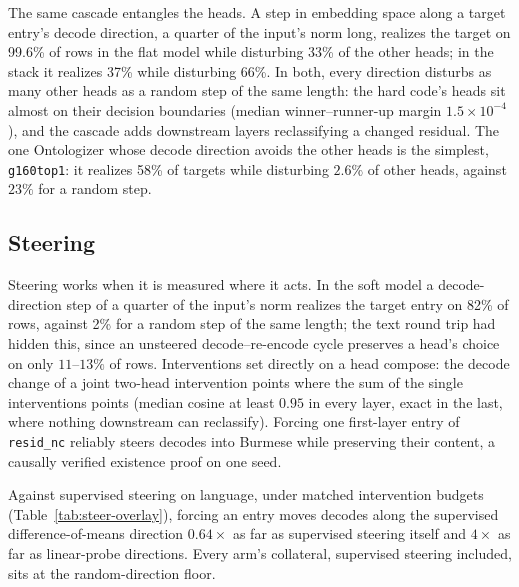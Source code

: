 The same cascade entangles the heads. A step in embedding space along a
target entry's decode direction, a quarter of the input's norm long,
realizes the target on 99.6\% of rows in the flat model while disturbing
33\% of the other heads; in the stack it realizes 37\% while disturbing
66\%. In both, every direction disturbs as many other heads as a random
step of the same length: the hard code's heads sit almost on their
decision boundaries (median winner--runner-up margin $1.5\times10^{-4}$),
and the cascade adds downstream layers reclassifying a changed residual.
The one Ontologizer whose decode direction avoids the other heads is
the simplest, \texttt{g160top1}: it realizes 58\% of targets while
disturbing $2.6\%$ of other heads, against $23\%$ for a random step.

\subsection{Steering}
\label{sec:prelim-steer}
Steering works when it is measured where it acts. In the soft model a
decode-direction step of a quarter of the input's norm realizes the
target entry on 82\% of rows, against 2\% for a random step of the same
length; the text
round trip had hidden this, since an unsteered decode--re-encode cycle
preserves a head's choice on only $11$--$13\%$ of rows. Interventions
set directly on a head compose: the decode change of a joint two-head
intervention points where the sum of the single interventions points
(median cosine at least $0.95$ in every layer, exact in the last, where
nothing downstream can reclassify). Forcing one first-layer entry of
\texttt{resid\_nc} reliably steers decodes into Burmese while preserving
their content, a causally verified existence proof on one seed.

Against supervised steering on language, under matched intervention
budgets (Table~\ref{tab:steer-overlay}), forcing an entry moves decodes
along the supervised difference-of-means direction $0.64\times$ as far
as supervised steering itself and $4\times$ as far as linear-probe
directions. Every arm's collateral, supervised steering included, sits
at the random-direction floor.

